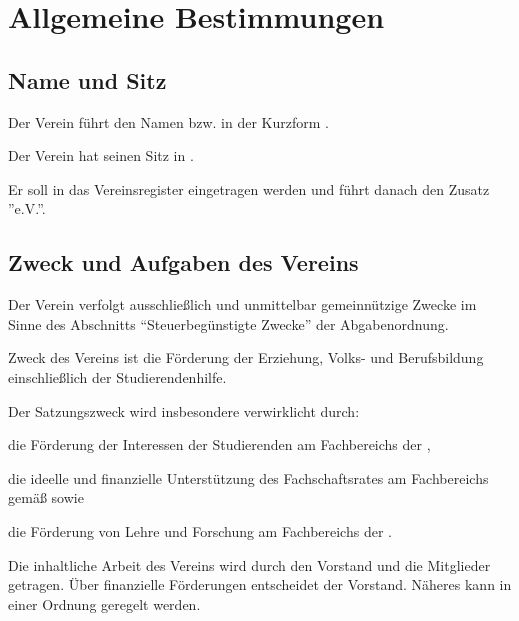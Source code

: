 \chapter{Allgemeine Bestimmungen}
\label{sec:Allg_Bestimmung}


\section{Name und Sitz}
	\begin{absätze}
		\item Der Verein führt den Namen \textit{\Vereinsname{}} bzw. in der Kurzform \textit{\VereinsnameKurz{}}.
		\item Der Verein hat seinen Sitz in \Stadt{}.
		\item Er soll in das Vereinsregister eingetragen werden und führt danach den Zusatz ''e.V.''.
	\end{absätze}

\section{Zweck und Aufgaben des Vereins}
	\begin{absätze}
		\item Der Verein verfolgt ausschließlich und unmittelbar gemeinnützige Zwecke im Sinne des Abschnitts "`Steuerbegünstigte Zwecke"' der Abgabenordnung.
		\item Zweck des Vereins ist die Förderung der Erziehung, Volks- und Berufsbildung einschließlich der Studierendenhilfe.
		\item Der Satzungszweck wird insbesondere verwirklicht durch:
		\begin{sätze}
			\item die Förderung der Interessen der Studierenden am Fachbereichs \Fach{} der \Uni{},
			\item die ideelle und finanzielle Unterstützung des Fachschaftsrates am Fachbereichs \Fach{} gemäß \VerweisFachschaftsrat{} sowie
			\item die Förderung von Lehre und Forschung am Fachbereichs \Fach{} der \Uni{}.
		\end{sätze}
		\item Die inhaltliche Arbeit des Vereins wird durch den Vorstand und die Mitglieder getragen. Über finanzielle Förderungen entscheidet der Vorstand. Näheres kann in einer Ordnung geregelt werden.
	\end{absätze}

